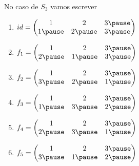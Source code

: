 \documentclass{beamer}
\begin{document}
    \begin{frame}
        No caso de $S_3$ vamos escrever\pause
        \begin{multicols}{3}
            \begin{enumerate}
                \item[] $id = \begin{pmatrix}
                    1 & 2 & 3\pause\\
                    1 \pause & 2 \pause & 3\pause
                \end{pmatrix}$\pause

                \vspace{.5cm}

                \item[] $f_1 = \begin{pmatrix}
                    1 & 2 & 3 \pause\\
                    2 \pause & 1 \pause & 3 \pause
                \end{pmatrix}$\pause

                \vspace{.5cm}
                
                \item[] $f_2 = \begin{pmatrix}
                    1 & 2 & 3 \pause\\
                    3 \pause & 2 \pause & 1 \pause
                \end{pmatrix}$\pause

                \vspace{.5cm}
                
                \item[] $f_3 = \begin{pmatrix}
                    1 & 2 & 3 \pause\\
                    1 \pause & 3 \pause & 2 \pause
                \end{pmatrix}$\pause

                \vspace{.5cm}
                
                \item[] $f_4 = \begin{pmatrix}
                    1 & 2 & 3 \pause\\
                    2 \pause & 3 \pause & 1 \pause
                \end{pmatrix}$\pause

                \vspace{.5cm}
                
                \item[] $f_5 = \begin{pmatrix}
                    1 & 2 & 3 \pause\\
                    3 \pause & 1 \pause & 2 \pause
                \end{pmatrix}$\pause
            \end{enumerate}
        \end{multicols}
    \end{frame}
\end{document}
